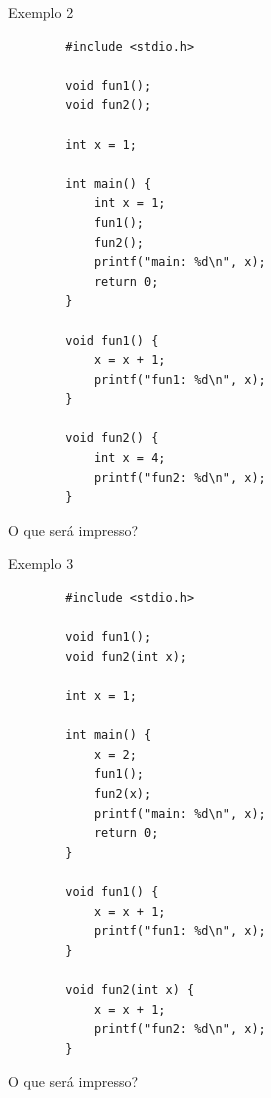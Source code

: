 \documentclass[handout]{beamer}
\begin{document}
\begin{frame}[fragile]{Exemplo 2}

    \begin{verbatim}
        #include <stdio.h>
        
        void fun1();
        void fun2();

        int x = 1;
        
        int main() {
            int x = 1;
            fun1();
            fun2();
            printf("main: %d\n", x);
            return 0;
        }

        void fun1() {
            x = x + 1;
            printf("fun1: %d\n", x);
        }

        void fun2() {
            int x = 4;
            printf("fun2: %d\n", x);
        }
    \end{verbatim}

    O que será impresso?
\end{frame}

\begin{frame}[fragile]{Exemplo 3}

    \begin{verbatim}
        #include <stdio.h>

        void fun1();
        void fun2(int x);

        int x = 1;

        int main() {
            x = 2;
            fun1();
            fun2(x);
            printf("main: %d\n", x);
            return 0;
        }

        void fun1() {
            x = x + 1;
            printf("fun1: %d\n", x);
        }

        void fun2(int x) {
            x = x + 1;
            printf("fun2: %d\n", x);
        }
    \end{verbatim}

    O que será impresso?
\end{frame}
\end{document}
